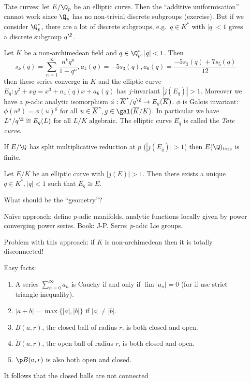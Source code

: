 \documentclass[a4paper]{article}
\begin{document}
Tate curves: let \(E/\Q_p\) be an elliptic curve. Then the ``additive uniformisation'' cannot work since \(\Q_p\) has no non-trivial discrete subgroups (exercise). But if we consider \(\Q_p^*\), there are a lot of discrete subgroups, e.g.\ \(q \in K^*\) with \(|q| < 1\) gives a discrete subgroup \(q^\Z\).

\begin{theorem}[Tate]
  Let \(K\) be a non-archimedean field and \(q \in \Q_p^*, |q| < 1\). Then
  \[
    s_k(q) = \sum_{n = 1}^\infty \frac{n^k q^n}{1 - q^n}, a_4(q) = -5 s_3(q), a_6(q) = \frac{-5s_3(q) + 7s_5(q)}{12}
  \]
  then these series converge in \(K\) and the elliptic curve \(E_q: y^2 + xy = x^3 + a_4(q) x + a_6(q)\) has \(j\)-invariant \(|j(E_q)| > 1\). Moreover we have a \(p\)-adic analytic isomorphism \(\phi: \overline K^*/q^\Z \to E_q(\overline K)\). \(\phi\) is Galois invariant: \(\phi(u^g) = \phi(u)^g\) for all \(u \in \overline K^*, g \in \gal(\overline K/K)\). In particular we have \(L^*/q^\Z \cong E_q(L)\) for all \(L/K\) algebraic. The elliptic curve \(E_q\) is called the \emph{Tate curve}.
\end{theorem}

\begin{ex}
  If \(E/\Q\) has split multiplicative reduction at \(p\) (\(|j(E_q)| > 1\)) then \(E(\Q)_{\operatorname{tors}}\) is finite.
\end{ex}

\begin{theorem}
  Let \(E/K\) be an elliptic curve with \(|j(E)| > 1\). Then there exists a unique \(q \in K^*, |q| < 1\) such that \(E_q \cong E\).
\end{theorem}

What should be the ``geometry''? 

Naïve approach: define \(p\)-adic manifolds, analytic functions locally given by power converging power series. Book: J-P. Serre: \(p\)-adic Lie groups.

Problem with this approach: if \(K\) is non-archimedean then it is totally disconnected!

\begin{ex}
  Easy facts:
  \begin{enumerate}
  \item A series \(\sum_{n = 0}^\infty a_n\) is Cauchy if and only if \(\lim |a_n| = 0\) (for if use strict triangle inequality).
  \item \(|a + b| = \max\{|a|, |b|\}\) if \(|a| \ne |b|\).
  \item \(B(a, r)\), the closed ball of radius \(r\), is both closed and open.
  \item \(\mathring B(a, r)\), the open ball of radius \(r\), is both closed and open.
  \item \(\p B(a, r)\) is also both open and closed.
  \end{enumerate}
  It follows that the closed balls are not connected
\end{ex}
\end{document}
